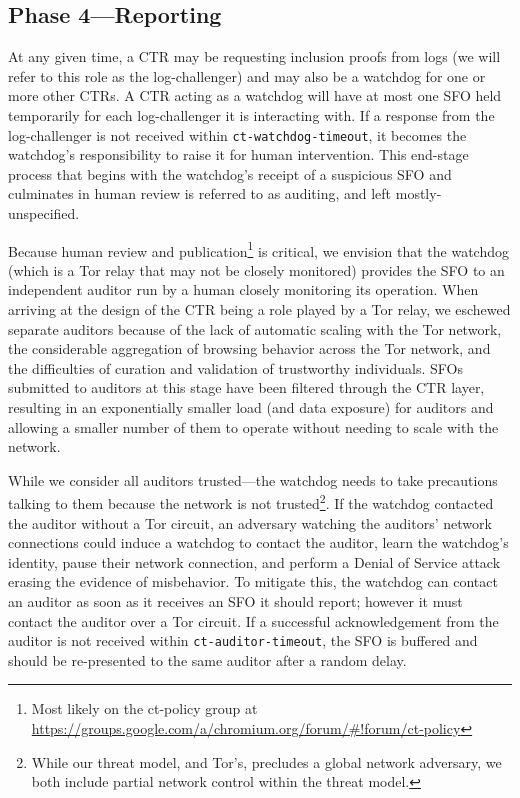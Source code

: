 \subsection{Phase 4---Reporting}

At any given time, a CTR may be requesting inclusion proofs from logs (we will
refer to this role as the log-challenger) and may also be a watchdog for one or
more other CTRs. A CTR acting as a watchdog will have at most one SFO held
temporarily for each log-challenger it is interacting with. If a response from
the log-challenger is not received within \texttt{ct-watchdog-timeout}, it
becomes the watchdog's responsibility to raise it for human intervention. This
end-stage process that begins with the watchdog's receipt of a suspicious SFO
and culminates in human review is referred to as auditing, and left
mostly-unspecified.

Because human review and publication\footnote{Most likely on the ct-policy group
at \url{https://groups.google.com/a/chromium.org/forum/\#!forum/ct-policy}} is
critical, we envision that the watchdog (which is a Tor relay that may not be
closely monitored) provides the SFO to an independent auditor run by a human
closely monitoring its operation. When arriving at the design of the CTR being a
role played by a Tor relay, we eschewed separate auditors because of the lack of
automatic scaling with the Tor network, the considerable aggregation of browsing
behavior across the Tor network, and the difficulties of curation and validation
of trustworthy individuals. SFOs submitted to auditors at this stage have been
filtered through the CTR layer, resulting in an exponentially smaller load (and
data exposure) for auditors and allowing a smaller number of them to operate
without needing to scale with the network.

While we consider all auditors trusted---the watchdog needs to take precautions
talking to them because the network is not trusted\footnote{While our threat
model, and Tor's, precludes a global network adversary, we both include partial
network control within the threat model.}. If the watchdog contacted the auditor
without a Tor circuit, an adversary watching the auditors' network connections
could induce a watchdog to contact the auditor, learn the watchdog's identity,
pause their network connection, and perform a Denial of Service attack erasing
the evidence of misbehavior. To mitigate this, the watchdog can contact an
auditor as soon as it receives an SFO it should report; however it must contact
the auditor over a Tor circuit. If a successful acknowledgement from the auditor
is not received within \texttt{ct-auditor-timeout}, the SFO is buffered and
should be re-presented to the same auditor after a random delay.

